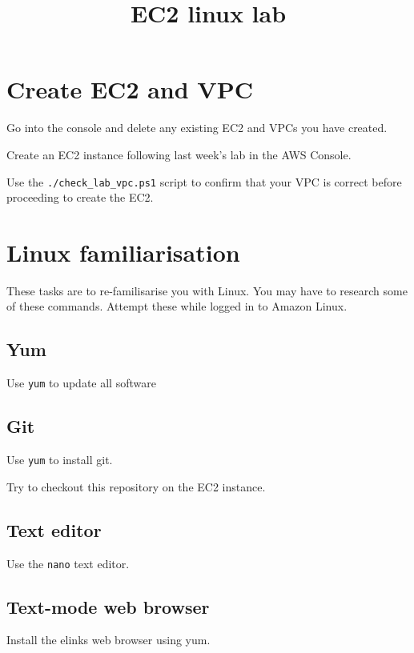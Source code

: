 \documentclass{pgnotes}
\title{EC2 linux lab}
\begin{document}
\maketitle

\section{Create EC2 and VPC}\label{create-ec2-and-vpc}

Go into the console and delete any existing EC2 and VPCs you have
created.

Create an EC2 instance following last week's lab in the AWS Console.

Use the \texttt{./check\_lab\_vpc.ps1} script to confirm that your VPC is correct before proceeding to create the EC2.


\section{Linux familiarisation}\label{linux-familiarisation}

These tasks are to re-familisarise you with Linux.
You may have to research some of these commands. 
Attempt these while logged in to Amazon Linux.

\subsection{Yum}
\label{yum}

Use \texttt{yum} to update all software

\subsection{Git}
\label{git}

Use \texttt{yum} to install git.

Try to checkout this repository on the EC2 instance.

\subsection{Text editor}\label{text-editor}

Use the \texttt{nano} text editor.

\subsection{Text-mode web browser}

Install the elinks web browser using yum. 
\end{document}
